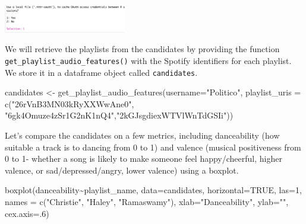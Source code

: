 \documentclass[
  letterpaper,
  DIV=11,
  numbers=noendperiod]{scrreprt}
\newenvironment{Shaded}{\begin{snugshade}}{\end{snugshade}}
\newcommand{\AttributeTok}[1]{\textcolor[rgb]{0.40,0.45,0.13}{#1}}
\newcommand{\ConstantTok}[1]{\textcolor[rgb]{0.56,0.35,0.01}{#1}}
\newcommand{\DecValTok}[1]{\textcolor[rgb]{0.68,0.00,0.00}{#1}}
\newcommand{\FunctionTok}[1]{\textcolor[rgb]{0.28,0.35,0.67}{#1}}
\newcommand{\NormalTok}[1]{\textcolor[rgb]{0.00,0.23,0.31}{#1}}
\newcommand{\OtherTok}[1]{\textcolor[rgb]{0.00,0.23,0.31}{#1}}
\newcommand{\SpecialCharTok}[1]{\textcolor[rgb]{0.37,0.37,0.37}{#1}}
\newcommand{\StringTok}[1]{\textcolor[rgb]{0.13,0.47,0.30}{#1}}
\begin{document}
\includegraphics[width=0.4\textwidth,height=\textheight]{images/cachespot.png}

We will retrieve the playlists from the candidates by providing the
function \texttt{get\_playlist\_audio\_features()} with the Spotify
identifiers for each playlist. We store it in a dataframe object called
\texttt{candidates}.

\begin{Shaded}
\begin{Highlighting}[]
\NormalTok{candidates }\OtherTok{\textless{}{-}} \FunctionTok{get\_playlist\_audio\_features}\NormalTok{(}\AttributeTok{username=}\StringTok{"Politico"}\NormalTok{,}
                            \AttributeTok{playlist\_uris =} \FunctionTok{c}\NormalTok{(}\StringTok{"26rVnB3MN03kRyXXWwAne0"}\NormalTok{, }\StringTok{"6gk4Omuze4zSr1G2nK1nQ4"}\NormalTok{,}\StringTok{"2kGJsgdiexWTVlWnTdGSIi"}\NormalTok{))}
\end{Highlighting}
\end{Shaded}

Let's compare the candidates on a few metrics, including danceability
(how suitable a track is to dancing from 0 to 1) and valence (musical
positiveness from 0 to 1- whether a song is likely to make someone feel
happy/cheerful, higher valence, or sad/depressed/angry, lower valence)
using a boxplot.

\begin{Shaded}
\begin{Highlighting}[]
\FunctionTok{boxplot}\NormalTok{(danceability}\SpecialCharTok{\textasciitilde{}}\NormalTok{playlist\_name, }\AttributeTok{data=}\NormalTok{candidates, }\AttributeTok{horizontal=}\ConstantTok{TRUE}\NormalTok{, }\AttributeTok{las=}\DecValTok{1}\NormalTok{, }
        \AttributeTok{names =} \FunctionTok{c}\NormalTok{(}\StringTok{"Christie"}\NormalTok{, }\StringTok{"Haley"}\NormalTok{,}
                                                                                \StringTok{"Ramaswamy"}\NormalTok{), }
        \AttributeTok{xlab=}\StringTok{"Danceability"}\NormalTok{, }\AttributeTok{ylab=}\StringTok{""}\NormalTok{,}
        \AttributeTok{cex.axis=}\NormalTok{.}\DecValTok{6}\NormalTok{)}
\end{Highlighting}
\end{Shaded}
\end{document}

